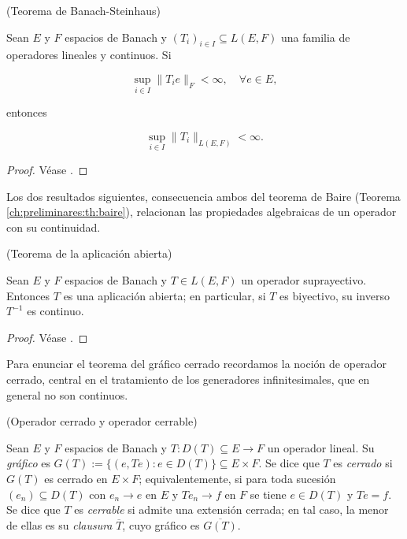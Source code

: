\begin{Teorema}{(Teorema de Banach-Steinhaus)}
\label{ch:preliminares:th:banachSteinhaus}

Sean $E$ y $F$ espacios de Banach y $(T_i)_{i \in I} \subseteq L(E, F)$ una
familia de operadores lineales y continuos. Si

\[\sup_{i \in I} \lVert T_i e \rVert_F < \infty, \quad \forall e \in E,\]

entonces

\[\sup_{i \in I} \lVert T_i \rVert_{L(E, F)} < \infty.\]
\end{Teorema}

\begin{proof}
Véase \cite[Teorema~2.2]{brezis-2011-fun-ana-sob}.
\end{proof}

Los dos resultados siguientes, consecuencia ambos del teorema de Baire
(Teorema \ref{ch:preliminares:th:baire}), relacionan
las propiedades algebraicas de un operador con su continuidad.\\

\begin{Teorema}{(Teorema de la aplicación abierta)}
\label{ch:preliminares:th:aplicacionAbierta}

Sean $E$ y $F$ espacios de Banach y $T \in L(E, F)$ un operador suprayectivo.
Entonces $T$ es una aplicación abierta; en particular, si $T$ es biyectivo, su
inverso $T^{-1}$ es continuo.
\end{Teorema}

\begin{proof}
Véase \cite[Teorema~2.6]{brezis-2011-fun-ana-sob}.
\end{proof}

Para enunciar el teorema del gráfico cerrado recordamos la noción de operador
cerrado, central en el tratamiento de los generadores infinitesimales, que en
general no son continuos.\\

\begin{Definicion}{(Operador cerrado y operador cerrable)}
\label{ch:preliminares:def:cerrado}

Sean $E$ y $F$ espacios de Banach y $T : D(T) \subseteq E \rightarrow F$ un
operador lineal. Su \textit{gráfico} es
$G(T) := \{(e, Te) : e \in D(T)\} \subseteq E \times F$. Se dice que $T$ es
\textit{cerrado} si $G(T)$ es cerrado en $E \times F$; equivalentemente, si para
toda sucesión $(e_n) \subseteq D(T)$ con $e_n \rightarrow e$ en $E$ y
$Te_n \rightarrow f$ en $F$ se tiene $e \in D(T)$ y $Te = f$. Se dice que $T$ es
\textit{cerrable} si admite una extensión cerrada; en tal caso, la menor de ellas
es su \textit{clausura} $\overline{T}$, cuyo gráfico es $\overline{G(T)}$.
\end{Definicion}

